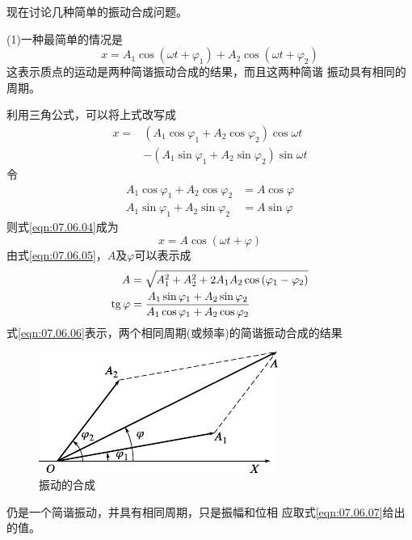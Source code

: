 现在讨论几种简单的振动合成问题。

(1)一种最简单的情况是
\begin{equation}\label{eqn:07.06.03}
  x = A _ { 1 } \cos \left( \omega t + \varphi _ { 1 } \right) + A _ { 2 } \cos \left( \omega t + \varphi _ { 2 } \right)
\end{equation}
这表示质点的运动是两种简谐振动合成的结果，而且这两种简谐
振动具有相同的周期。

利用三角公式，可以将上式改写成
\begin{equation}\label{eqn:07.06.04}
  \begin{aligned}
    x = & \left( A _ { 1 } \cos \varphi _ { 1 } + A _ { 2 } \cos \varphi _ { 2 } \right) \cos \omega t   \\[-0.5em]
        & - \left( A _ { 1 } \sin \varphi _ { 1 } + A _ { 2 } \sin \varphi _ { 2 } \right) \sin \omega t
  \end{aligned}
\end{equation}
令\vspace{-1.56em}
\begin{equation}\label{eqn:07.06.05}
  \begin{aligned}
    A _ { 1 } \cos \varphi _ { 1 } + A _ { 2 } \cos \varphi _ { 2 }  & = A  \cos \varphi \\[-0.5em]
    A _ { 1 } \sin \varphi _ { 1 } + A _ { 2 }  \sin \varphi _ { 2 } & = A  \sin \varphi
  \end{aligned}
\end{equation}
则式\eqref{eqn:07.06.04}成为
\begin{equation}\label{eqn:07.06.06}
  x = A  \cos \left( \omega t +  \varphi \right)
\end{equation}
由式\ref{eqn:07.06.05}，$ A $及$ \varphi $可以表示成
\begin{equation}\label{eqn:07.06.07}
  \begin{split}
    A &= \sqrt { A _ { 1 } ^ { 2 } + A _ 2 ^ { 2 } + 2 A _ { 1 } A _ { 2 }  \cos \left( \varphi _ { 1 } -  \varphi _ { 2 } \right) } \\
    \operatorname{tg} \varphi &= \frac { A _ { 1 }  \sin \varphi _ { 1 } + A _ { 2 } \sin \varphi _ { 2 } } { A _ { 1 }  \cos \varphi _ { 1 } + A _ { 2 } \cos \varphi _ { 2 } }
  \end{split}
\end{equation}
式\eqref{eqn:07.06.06}表示，两个相同周期(或频率)的简谐振动合成的结果
\begin{figure}
  \vspace{-1em}
  \centering
  \includegraphics{figure/fig07.11}
  \caption{振动的合成}
  \label{fig:07.11}
\end{figure}
仍是一个简谐振动，并具有相同周期，只是振幅和位相
应取式\eqref{eqn:07.06.07}给出的值。

